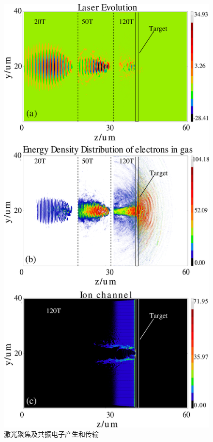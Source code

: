 \begin{figure}[!htbp]
  \centering
  \includegraphics[width=\MyFactor\textwidth]{Img/laserEvolution.eps}
  \caption{激光聚焦及共振电子产生和传输}
  \label{fig:laserEvolution}
\end{figure}


